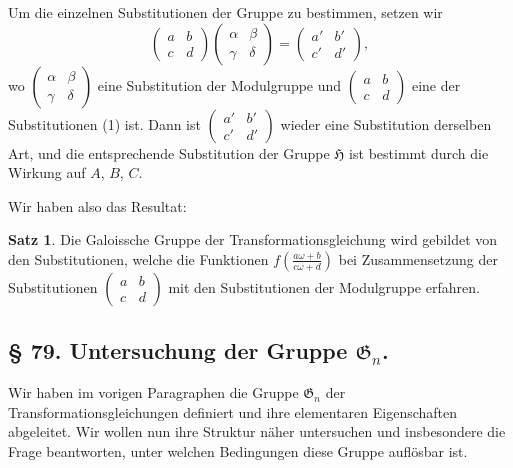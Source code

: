 \documentclass[12pt,a4paper]{article}
\theoremstyle{definition}
\newtheorem*{satz}{Satz}
\begin{document}
Um die einzelnen Substitutionen der Gruppe zu bestimmen,
setzen wir
\begin{equation}\tag{7}
\begin{pmatrix} a & b \\ c & d \end{pmatrix} \begin{pmatrix} \alpha & \beta \\ \gamma & \delta \end{pmatrix} = \begin{pmatrix} a' & b' \\ c' & d' \end{pmatrix},
\end{equation}
wo $\begin{pmatrix} \alpha & \beta \\ \gamma & \delta \end{pmatrix}$ eine Substitution der Modulgruppe
und $\begin{pmatrix} a & b \\ c & d \end{pmatrix}$ eine der Substitutionen (1) ist. Dann
ist $\begin{pmatrix} a' & b' \\ c' & d' \end{pmatrix}$ wieder eine Substitution derselben
Art, und die entsprechende Substitution der Gruppe $\mathfrak{H}$
ist bestimmt durch die Wirkung auf $A$, $B$, $C$.

Wir haben also das Resultat:
\begin{satz}
Die Galoissche Gruppe der Transformationsgleichung wird
gebildet von den Substitutionen, welche die Funktionen
$f\left(\frac{a\omega+b}{c\omega+d}\right)$ bei Zusammensetzung der
Substitutionen $\begin{pmatrix} a & b \\ c & d \end{pmatrix}$ mit den Substitutionen
der Modulgruppe erfahren.
\end{satz}

\subsection*{\S{} 79. Untersuchung der Gruppe $\mathfrak{G}_n$.}

Wir haben im vorigen Paragraphen die Gruppe $\mathfrak{G}_n$ der
Transformationsgleichungen definiert und ihre elementaren
Eigenschaften abgeleitet. Wir wollen nun ihre Struktur n\"aher
untersuchen und insbesondere die Frage beantworten, unter
welchen Bedingungen diese Gruppe aufl\"osbar ist.
\end{document}
